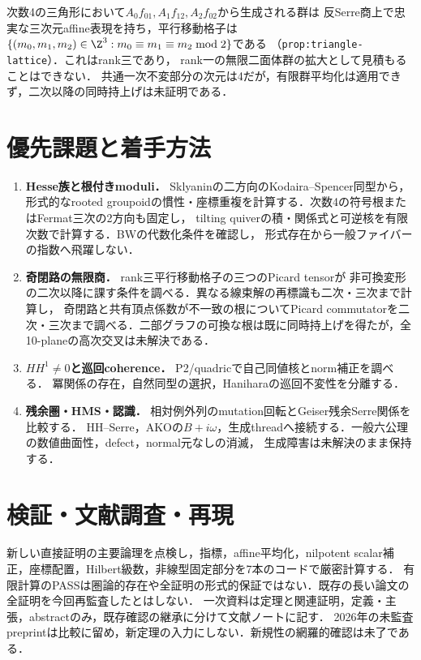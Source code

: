 \documentclass[11pt,a4paper]{ltjsarticle}
\begin{document}
次数4の三角形において$A_0f_{01},A_1f_{12},A_2f_{02}$から生成される群は
反Serre商上で忠実な三次元affine表現を持ち，平行移動格子は
$\{(m_0,m_1,m_2)\in\Z^3:m_0\equiv m_1\equiv m_2\bmod2\}$である
（\texttt{prop:triangle-lattice}）．これはrank三であり，
rank一の無限二面体群の拡大として見積もることはできない．
共通一次不変部分の次元は4だが，有限群平均化は適用できず，二次以降の同時持上げは未証明である．

\section{優先課題と着手方法}
\begin{enumerate}
\item \textbf{Hesse族と根付きmoduli．} Sklyaninの二方向のKodaira--Spencer同型から，
形式的なrooted groupoidの慣性・座標重複を計算する．次数4の符号根またはFermat三次の2方向も固定し，
tilting quiverの積・関係式と可逆核を有限次数で計算する．BWの代数化条件を確認し，
形式存在から一般ファイバーの指数へ飛躍しない．
\item \textbf{奇閉路の無限商．} rank三平行移動格子の三つのPicard tensorが
非可換変形の二次以降に課す条件を調べる．異なる線束解の再標識も二次・三次まで計算し，
奇閉路と共有頂点係数が不一致の根についてPicard commutatorを二次・三次まで調べる．二部グラフの可換な根は既に同時持上げを得たが，全10-planeの高次交叉は未解決である．
\item \textbf{$HH^1\ne0$と巡回coherence．} P2/quadricで自己同値核とnorm補正を調べる．
冪関係の存在，自然同型の選択，Haniharaの巡回不変性を分離する．
\item \textbf{残余圏・HMS・認識．} 相対例外列のmutation回転とGeiser残余Serre関係を比較する．
HH--Serre，AKOの$B+i\omega$，生成threadへ接続する．一般六公理の数値曲面性，defect，normal元なしの消滅，
生成障害は未解決のまま保持する．
\end{enumerate}

\section{検証・文献調査・再現}
新しい直接証明の主要論理を点検し，指標，affine平均化，nilpotent scalar補正，座標配置，Hilbert級数，非線型固定部分を7本のコードで厳密計算する．
有限計算のPASSは圏論的存在や全証明の形式的保証ではない．既存の長い論文の全証明を今回再監査したとはしない．
一次資料は定理と関連証明，定義・主張，abstractのみ，既存確認の継承に分けて文献ノートに記す．
2026年の未監査preprintは比較に留め，新定理の入力にしない．新規性の網羅的確認は未了である．
\end{document}
